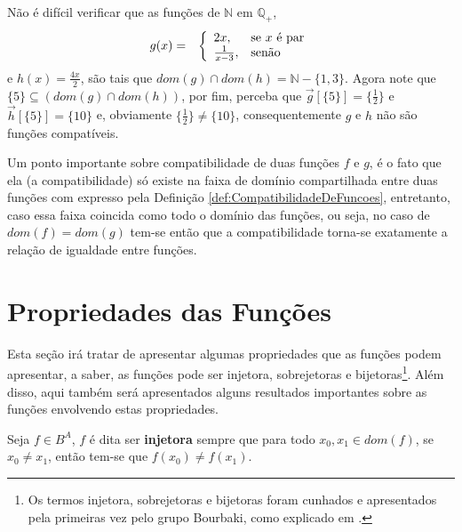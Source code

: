 \begin{exemplo}\label{exe:FuncoesCompativeis2}
	Não é difícil verificar que as funções de $\mathbb{N}$ em $\mathbb{Q}_+$,
	\begin{eqnarray*}
		g(x) & = & \left\{\begin{array}{ll}	2x, & \hbox{se } x \mbox{ é par}\\\frac{1}{x - 3},  & \hbox{senão}\end{array}\right.
	\end{eqnarray*}
	e $h(x) =  \displaystyle\frac{4x}{2}$, são tais que $dom(g) \cap dom(h) = \mathbb{N} - \{1, 3\}$. Agora note que $\{5\} \subseteq (dom(g) \cap dom(h))$, por fim, perceba que $\overrightarrow{g}[\{5\}] = \displaystyle\Big\{\frac{1}{2}\Big\}$ e $\overrightarrow{h}[\{5\}] = \{10\}$ e, obviamente $\displaystyle\Big\{\frac{1}{2}\Big\} \neq \{10\}$, consequentemente $g$ e $h$ não são funções compatíveis.
\end{exemplo}

Um ponto importante sobre compatibilidade de duas funções $f$ e $g$, é o fato que ela (a compatibilidade) só existe na faixa de domínio compartilhada entre duas funções com expresso pela Definição \ref{def:CompatibilidadeDeFuncoes}, entretanto, caso essa faixa coincida como todo o domínio das funções, ou seja, no caso de $dom(f) = dom(g)$ tem-se então que a compatibilidade torna-se exatamente a relação de igualdade entre funções.

\section{Propriedades das Funções}

Esta seção irá tratar de apresentar algumas propriedades que as funções podem apresentar, a saber, as funções pode ser injetora, sobrejetoras e bijetoras\footnote{Os termos injetora, sobrejetoras e bijetoras foram cunhados e apresentados pela primeiras vez pelo grupo Bourbaki, como explicado em \cite{jeff-miller-web}.}. Além disso, aqui também será apresentados alguns resultados importantes sobre as funções envolvendo estas propriedades.

\begin{definicao}\label{def:FuncaoInjetora}
	Seja $f \in B^A$, $f$ é dita ser \textbf{injetora} sempre que para todo $x_0, x_1 \in dom(f)$, se $x_0 \neq x_1$, então tem-se que $f(x_0) \neq f(x_1)$.
\end{definicao}

